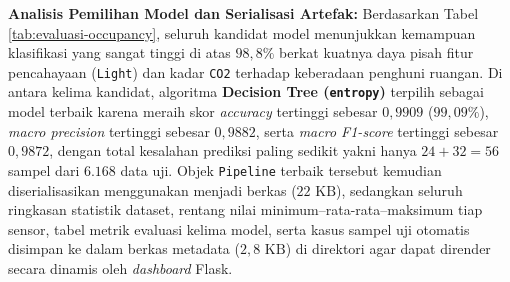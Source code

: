 \documentclass[a4paper,oneside,11pt]{book}
\begin{document}
\begin{table}[H]
  \centering
  \renewcommand{\arraystretch}{1.25}
  \caption{Perbandingan Kinerja Lima Model Klasifikasi pada \textit{Test Set} Dataset \textit{Room Occupancy}}
  \label{tab:evaluasi-occupancy}
\end{table}

\par \textbf{Analisis Pemilihan Model dan Serialisasi Artefak:} Berdasarkan Tabel \ref{tab:evaluasi-occupancy}, seluruh kandidat model menunjukkan kemampuan klasifikasi yang sangat tinggi di atas $98{,}8\%$ berkat kuatnya daya pisah fitur pencahayaan (\texttt{Light}) dan kadar \texttt{CO2} terhadap keberadaan penghuni ruangan. Di antara kelima kandidat, algoritma \textbf{Decision Tree (\texttt{entropy})} terpilih sebagai model terbaik karena meraih skor \textit{accuracy} tertinggi sebesar $0{,}9909$ ($99{,}09\%$), \textit{macro precision} tertinggi sebesar $0{,}9882$, serta \textit{macro F1-score} tertinggi sebesar $0{,}9872$, dengan total kesalahan prediksi paling sedikit yakni hanya $24 + 32 = 56$ sampel dari $6.168$ data uji. Objek \texttt{Pipeline} terbaik tersebut kemudian diserialisasikan menggunakan  menjadi berkas  ($22\text{ KB}$), sedangkan seluruh ringkasan statistik dataset, rentang nilai minimum--rata-rata--maksimum tiap sensor, tabel metrik evaluasi kelima model, serta kasus sampel uji otomatis disimpan ke dalam berkas metadata  ($2{,}8\text{ KB}$) di direktori  agar dapat dirender secara dinamis oleh \textit{dashboard} Flask.
\end{document}
